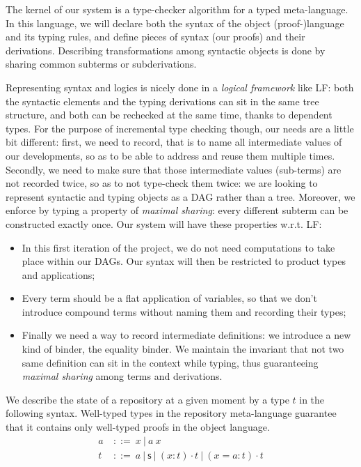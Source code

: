 \documentclass{article}
\newcommand{\sort}{\textsf{s}}
\newcommand{\gor}{\ |\ }
\newcommand{\gdecl}[2]{{#1}\ &::=\ {#2}}
\begin{document}
The kernel of our system is a type-checker algorithm for a typed
meta-language. In this language, we will declare both the syntax of
the object (proof-)language and its typing rules, and define pieces of
syntax (our proofs) and their derivations. Describing transformations
among syntactic objects is done by sharing common subterms or
subderivations.

Representing syntax and logics is nicely done in a \emph{logical
  framework} like LF: both the syntactic elements and the typing
derivations can sit in the same tree structure, and both can be
rechecked at the same time, thanks to dependent types. For the purpose
of incremental type checking though, our needs are a little bit
different: first, we need to record, that is to name all intermediate
values of our developments, so as to be able to address and reuse them
multiple times. Secondly, we need to make sure that those intermediate
values (sub-terms) are not recorded twice, so as to not type-check
them twice: we are looking to represent syntactic and typing objects
as a DAG rather than a tree. Moreover, we enforce by typing a property
of \emph{maximal sharing}: every different subterm can be constructed
exactly once. Our system will have these properties w.r.t. LF:
\begin{itemize}
\item In this first iteration of the project, we do not need
  computations to take place within our DAGs. Our syntax will then be
  restricted to product types and applications;
\item Every term should be a flat application of variables, so that we
  don't introduce compound terms without naming them and recording
  their types;
\item Finally we need a way to record intermediate definitions: we
  introduce a new kind of binder, the equality binder. We maintain the
  invariant that not two same definition can sit in the context while
  typing, thus guaranteeing \emph{maximal sharing} among terms and
  derivations.
\end{itemize}

We describe the state of a repository at a given moment by a type $t$
in the following syntax. Well-typed types in the repository
meta-language guarantee that it contains only well-typed proofs in the
object language.
\begin{align*}
 \gdecl{a}{x \gor a\ x } \\
 \gdecl{t}{a \gor \sort \gor (x:t)\cdot t \gor (x=a:t)\cdot t}
\end{align*}
\end{document}
